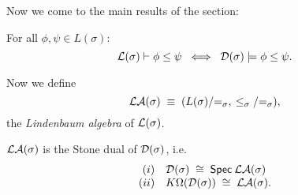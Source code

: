 Now we come to the main results of the section:
\begin{theorem}
For all $\phi , \psi \in L(\sigma )$:
\[ {\cal L} (\sigma ) \vdash \phi \leq \psi \;\; \Longleftrightarrow
\;\; {\cal D} (\sigma ) \models \phi \leq \psi . \]
\end{theorem}
Now we define 
\[{\cal LA}(\sigma ) \; \equiv \; (L(\sigma )/{=}_{\sigma}, \:
\leq_{\sigma}/{=}_{\sigma}),\]
the {\em Lindenbaum algebra} of
${\cal L}(\sigma )$.
\begin{theorem}
\label{sdual}
${\cal LA}(\sigma )$ is the Stone dual of ${\cal D}(\sigma )$, i.e.
\[\begin{array}{rl}
(i)  &  {\cal D}(\sigma ) \; \cong \; {\sf Spec} \: {\cal LA}(\sigma ) \\
(ii) &  K\Omega ( {\cal D}(\sigma )) \; \cong \; {\cal LA}(\sigma ).
\end{array} \]
\end{theorem}
